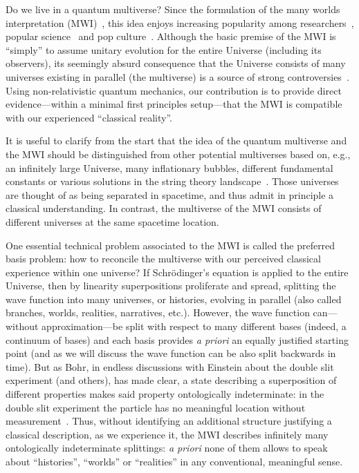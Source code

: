 \documentclass[pre,onecolumn,12pt,aps,longbibliography,nofootinbib]{revtex4-2}
\newcommand{\new}[1]{#1}
\begin{document}
Do we live in a quantum multiverse? Since the formulation of the many worlds interpretation (MWI)~\cite{EverettRMP1957, DeWittPT1970, Vaidman2021}, this idea enjoys increasing popularity among researchers~\cite{Carr2007, SaundersEtAlBook2010, WallaceBook2012}, popular science~\cite{CarrollPodcast2022} and pop culture~\cite{EEAAO2022}. Although the basic premise of the MWI is ``simply'' to assume \new{unitary evolution} for the entire Universe (including its observers), its seemingly absurd consequence that the Universe consists of many universes existing in parallel (the multiverse) is a source of strong controversies~\cite{GisinArXiv2022}. Using non-relativistic quantum mechanics, our contribution is to provide direct evidence---within a minimal first principles setup---that the MWI is compatible with our experienced ``classical reality''.

It is useful to clarify from the start that the idea of the quantum multiverse and the MWI should be distinguished from other potential multiverses based on, e.g., \new{an infinitely large Universe}, many inflationary bubbles, different fundamental constants or various solutions in the string theory landscape~\cite{TegmarkSA2003, Carr2007}. Those universes are thought of as being {separated} in spacetime, and thus admit in principle a classical understanding. In contrast, the multiverse of the MWI consists of different universes at the {same} spacetime location.

\new{One} essential technical problem associated to the MWI is called the preferred basis problem: how to reconcile the multiverse with our perceived classical experience within one universe? If \new{Schr\"odinger's equation} is applied to the entire Universe, then by linearity superpositions proliferate and spread, splitting the wave function into many universes, or histories, evolving in parallel (also called branches, worlds, realities, narratives, etc.). However, the wave function can---without approximation---be split with respect to many different bases (indeed, a continuum of bases) and each basis provides \emph{a priori} an equally justified starting point (and as we will discuss the wave function can be also split backwards in time). But as Bohr, in endless discussions with Einstein about the double slit experiment (and others), has made clear, a state describing a superposition of different properties makes said property {ontologically} indeterminate: in the double slit experiment the particle has no meaningful location without measurement~\cite{Barad2007}. Thus, without identifying an {additional structure} justifying a classical description, as we experience it, the MWI describes infinitely many ontologically indeterminate splittings: \emph{a priori} none of them allows to speak about ``histories'', ``worlds'' or ``realities'' in any conventional, meaningful sense.
\end{document}
